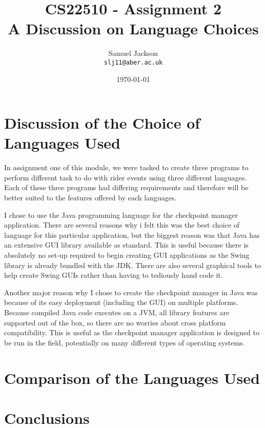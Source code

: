 \documentclass{article}
\begin{document}
\title{CS22510 - Assignment 2 \\ A Discussion on Language Choices}
\author{Samuel Jackson \\ \texttt{slj11@aber.ac.uk}}
\date{\today}
\maketitle

\section{Discussion of the Choice of Languages Used}
In assignment one of this module, we were tasked to create three programs to perform different task to do with rider events using three different languages. Each of these three programs had differing requirements and therefore will be better suited to the features offered by each languages.

I chose to use the Java programming language for the checkpoint manager application. There are several reasons why i felt this was the best choice of language for this particular application, but the biggest reason was that Java has an extensive GUI library available as standard. This is useful because there is absolutely no set-up required to begin creating GUI applications as the Swing library is already bundled with the JDK. There are also several graphical tools to help create Swing GUIs rather than having to tediously hand code it.

Another major reason why I chose to create the checkpoint manager in Java was because of its easy deployment (including the GUI) on multiple platforms. Because compiled Java code executes on a JVM, all library features are supported out of the box, so there are no worries about cross platform compatibility. This is useful as the checkpoint manager application is designed to be run in the field, potentially on many different types of operating systems.

\section{Comparison of the Languages Used}

\section{Conclusions}
\end{document}
